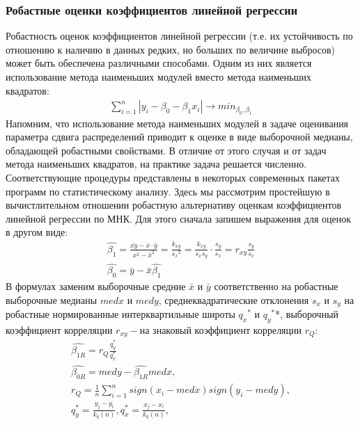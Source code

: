         \subsubsection{Робастные оценки коэффициентов линейной регрессии}
        Робастность оценок коэффициентов линейной регрессии (т.е. их устойчивость по отношению к наличию в данных редких, но больших по величине выбросов) может быть обеспечена различными способами. Одним из них является использование метода наименьших модулей вместо метода наименьших квадратов:
        \begin{gather}
            \sum_{i=1}^{n}{|y_i - \beta_0 - \beta_1x_i|} \rightarrow min_{\beta_0, \beta_1}
        \end{gather}
        Напомним, что использование метода наименьших модулей в задаче оценивания параметра сдвига распределений приводит к оценке в виде выборочной медианы, обладающей робастными свойствами. В отличие от этого случая и от задач метода наименьших квадратов, на практике задача решается численно. Соответствующие процедуры представлены в некоторых современных пакетах программ по статистическому анализу. Здесь мы рассмотрим простейшую в вычистлительном отношении робастную альтернативу оценкам коэффициентов линейной регрессии по МНК. Для этого сначала запишем выражения для оценок в другом виде:
        \begin{gather}
           \hat{\beta_1} = \frac{\bar{xy} - \bar{x} \cdot \bar{y}}{\bar{x^2} - \bar{x}^2} = \frac{k_{xy}}{{s_x}^2} = \frac{k_{xy}}{s_xs_y} \cdot \frac{s_y}{s_x} = r_{xy}\frac{s_y}{s_x}   \\
           \hat{\beta_0} = \bar{y} - \bar{x}\hat{\beta_1}
        \end{gather}
        В формулах заменим выборочные средние $\bar{x}$ и $\bar{y}$ соответственно на робастные выборочные медианы $med x$ и $med y$, среднеквадратические отклонения $s_x$ и $s_y$ на робастные нормированные интерквартильные широты ${q_x}^{*}$ и ${q_y}^{*}$*, выборочный коэффициент корреляции $r_{xy} -$на знаковый коэффициент корреляции $r_Q:$
        \begin{gather}
            \hat{\beta_{1R}} = r_Q\frac{q_y^{*}}{q_x^{*}}\\
            \hat{\beta_{0R}} = med y - \hat{\beta_{1R}}medx, \\
            r_Q = \frac{1}{n}\sum_{i=1}^nsign(x_i - medx)sign(y_i - medy),\\
            q_y^{*} = \frac{y_j - y_l}{k_q(n)}, q_x^{*} = \frac{x_j - x_l}{k_q(n)},\\
        \end{gather}
